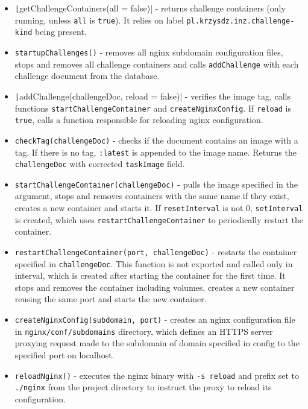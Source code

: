 \begin{itemize}
    \item \texttt|getChallengeContainers(all = false)| - returns challenge containers (only running, unless \texttt{all} is \texttt{true}). It relies on label \texttt{pl.krzysdz.inz.challenge-kind} being present.
    \item \texttt{startupChallenges()} - removes all nginx subdomain configuration files, stops and removes all challenge containers and calls \texttt{addChallenge} with each challenge document from the database.
    \item \texttt|addChallenge(challengeDoc, reload = false)| - verifies the image tag, calls functions \texttt{startChallengeContainer} and \texttt{createNginxConfig}. If \texttt{reload} is \texttt{true}, calls a function responsible for reloading nginx configuration.
    \item \texttt{checkTag(challengeDoc)} - checks if the document contains an image with a tag. If there is no tag, \texttt{:latest} is appended to the image name. Returns the \texttt{challengeDoc} with corrected \texttt{taskImage} field.
    \item \texttt{startChallengeContainer(challengeDoc)} - pulls the image specified in the argument, stops and removes containers with the same name if they exist, creates a new container and starts it. If \texttt{resetInterval} is not 0, \texttt{setInterval} is created, which uses \texttt{restartChallengeContainer} to periodically restart the container.
    \item \texttt{restartChallengeContainer(port, challengeDoc)} - restarts the container specified in \texttt{challengeDoc}. This function is not exported and called only in interval, which is created after starting the container for the first time. It stops and removes the container including volumes, creates a new container reusing the same port and starts the new container.
    \item \texttt{createNginxConfig(subdomain, port)} - creates an nginx configuration file in \texttt{nginx/conf/subdomains} directory, which defines an HTTPS server proxying request made to the subdomain of domain specified in config to the specified port on localhost.
    \item \texttt{reloadNginx()} - executes the nginx binary with \texttt{-s reload} and prefix set to \texttt{./nginx} from the project directory to instruct the proxy to reload its configuration.
\end{itemize}

